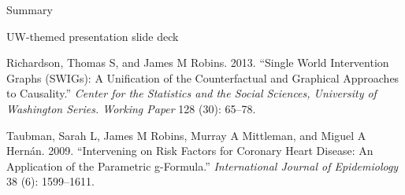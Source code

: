 \documentclass[
  10pt,
  ignorenonframetext,
]{beamer}
\newlength{\cslhangindent}
\newlength{\cslentryspacingunit} %
\newenvironment{CSLReferences}[2] %
 {%
  \setlength{\parindent}{0pt}
  \ifodd #1
  \let\oldpar\par
  \def\par{\hangindent=\cslhangindent\oldpar}
  \fi
  \setlength{\parskip}{#2\cslentryspacingunit}
 }%
 {}
\begin{document}
\begin{frame}[fragile]{Summary}
\begin{block}{UW-themed presentation slide deck}
\begin{CSLReferences}{1}{0}
\leavevmode{}%
Richardson, Thomas S, and James M Robins. 2013. {``Single World
Intervention Graphs (SWIGs): A Unification of the Counterfactual and
Graphical Approaches to Causality.''} \emph{Center for the Statistics
and the Social Sciences, University of Washington Series. Working Paper}
128 (30): 65--78.

\leavevmode{}%
Taubman, Sarah L, James M Robins, Murray A Mittleman, and Miguel A
Hernán. 2009. {``Intervening on Risk Factors for Coronary Heart Disease:
An Application of the Parametric g-Formula.''} \emph{International
Journal of Epidemiology} 38 (6): 1599--1611.

\end{CSLReferences}
\end{block}
\end{frame}
\end{document}
